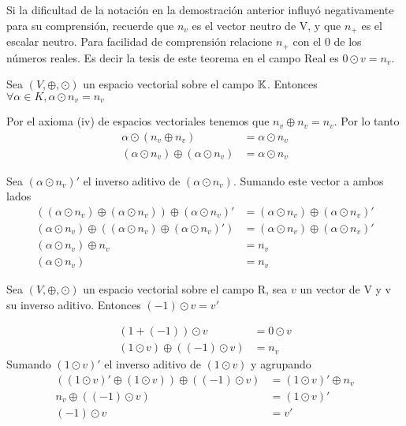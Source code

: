 Si la dificultad de la notación en la demostración anterior influyó negativamente para su comprensión, recuerde que $ n_v$ es el vector neutro de V, y que $n_+$ es el escalar neutro. Para facilidad de comprensión relacione $n_+$ con el 0 de los números reales. Es decir la tesis de este teorema en el campo Real es $0\odot v=n_v$.



\begin{theorem}
Sea $(V,\oplus ,\odot )$ un espacio vectorial sobre el campo $\mathbb{K}$. Entonces $\forall \alpha \in K,\alpha \odot n_v=n_v$
\end{theorem}

Por el axioma (iv) de espacios vectoriales tenemos que $n_v\oplus n_v=n_v$. Por lo tanto
\begin{align*}
    \alpha \odot (n_v\oplus n_v )&=\alpha \odot n_v\\
    (\alpha \odot n_v )\oplus (\alpha \odot n_v )&=\alpha \odot n_v
\end{align*}


Sea $ (\alpha \odot n_v )'$ el inverso aditivo de $(\alpha \odot n_v )$. Sumando este vector a ambos lados
\begin{align*}
    ((\alpha \odot n_v )\oplus (\alpha \odot n_v ))\oplus (\alpha \odot n_v )'&=(\alpha \odot n_v)\oplus (\alpha \odot n_v )'\\
    (\alpha \odot n_v )\oplus ((\alpha \odot n_v )\oplus (\alpha \odot n_v )' )&=(\alpha \odot n_v)\oplus (\alpha \odot n_v )'\\
    (\alpha \odot n_v )\oplus n_v&=n_v\\
    (\alpha \odot n_v )&=n_v
\end{align*}
               

\begin{theorem}
Sea $(V,\oplus ,\odot )$ un espacio vectorial sobre el campo R,  sea $v$ un vector de V y v su inverso aditivo. 
Entonces $(-1)\odot v=v'$
\end{theorem}

\begin{align*}
    (1+(-1))\odot v&=0\odot v\\
    (1\odot v)\oplus ((-1)\odot v)&=n_v
\end{align*}
Sumando $(1\odot v)'$ el inverso aditivo de $(1\odot v)$ y agrupando
\begin{align*}
    ((1\odot v)'\oplus (1\odot v))\oplus ((-1)\odot v)  &=(1\odot v)'\oplus n_v\\
    n_v\oplus ((-1)\odot v)&=(1\odot v)'\\
    (-1)\odot v&=v'
\end{align*}


